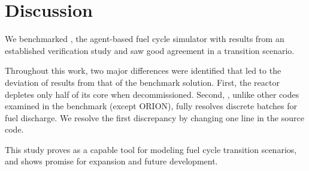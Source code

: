 \section{Discussion}

We benchmarked \Cyclus, the agent-based
fuel cycle simulator with results from an established
verification study and saw good agreement
in a transition scenario.

Throughout this work, two major differences were identified
that led to the deviation
of \Cyclus results from that of the benchmark solution. First,
the \Cycamore reactor depletes only half of its core
when decommissioned. Second, \Cyclus, unlike other
codes examined in the benchmark (except ORION), fully resolves
discrete batches for fuel discharge.
We resolve the first discrepancy by changing one line in the source code.

This study proves \Cyclus as a capable tool for modeling
fuel cycle transition scenarios, and shows promise for
expansion and future development.